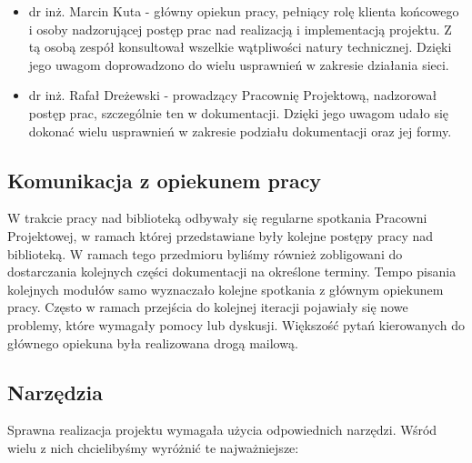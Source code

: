 \begin{itemize}
  \item dr inż. Marcin Kuta - główny opiekun pracy, pełniący rolę klienta końcowego i osoby nadzorującej
  postęp prac nad realizacją i implementacją projektu. Z tą osobą zespół konsultował wszelkie wątpliwości
  natury technicznej. Dzięki jego uwagom doprowadzono do wielu usprawnień w zakresie działania sieci.
  \item dr inż. Rafał Dreżewski - prowadzący Pracownię Projektową, nadzorował postęp prac, 
  szczególnie ten w dokumentacji. Dzięki jego uwagom udało się dokonać wielu usprawnień w zakresie podziału
  dokumentacji oraz jej formy.
\end{itemize}

\subsection{Komunikacja z opiekunem pracy}
W trakcie pracy nad biblioteką odbywały się regularne spotkania Pracowni Projektowej, w ramach której 
przedstawiane były kolejne postępy pracy nad biblioteką. W ramach tego przedmioru byliśmy również
zobligowani do dostarczania kolejnych części dokumentacji na określone terminy. Tempo pisania kolejnych modułów
samo wyznaczało kolejne spotkania z głównym opiekunem pracy. Często w ramach przejścia do kolejnej iteracji
pojawiały się nowe problemy, które wymagały pomocy lub dyskusji. Większość pytań kierowanych do 
głównego opiekuna była realizowana drogą mailową. 

\subsection{Narzędzia}
Sprawna realizacja projektu wymagała użycia odpowiednich narzędzi. Wśród wielu z nich
chcielibyśmy wyróżnić te najważniejsze:

